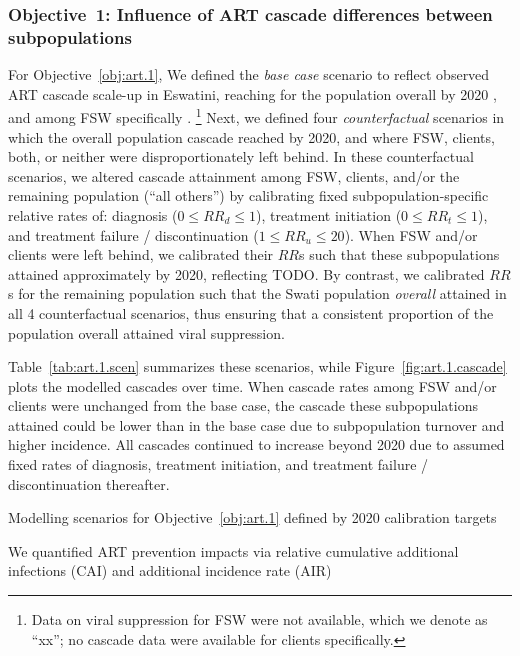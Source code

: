 \subsubsection{Objective~1: Influence of ART cascade differences between subpopulations}\label{art.meth.obj.1}
For Objective~\ref{obj:art.1},
We defined the \emph{base case} scenario to reflect
observed ART cascade scale-up in Eswatini, reaching
\cashi for the population overall by 2020 \cite{SHIMS3}, and
\casfsw among FSW specifically \cite{EswIBBS2022}.%
\footnote{Data on viral suppression for FSW were not available, which we denote as ``xx'';
  no cascade data were available for clients specifically.}
Next, we defined four \emph{counterfactual} scenarios in which
the overall population cascade reached \casmd by 2020,
and where FSW, clients, both, or neither were disproportionately left behind.
In these counterfactual scenarios, we altered cascade attainment among
FSW, clients, and/or the remaining population (``all others'') by calibrating
fixed subpopulation-specific relative rates of:
diagnosis ($0 \le {RR}_d \le 1$),
treatment initiation ($0 \le {RR}_t \le 1$), and
treatment failure / discontinuation ($1 \le {RR}_u \le 20$).
When FSW and/or clients were left behind, we calibrated their $RR$s such that
these subpopulations attained approximately \caslo by 2020,
reflecting TODO.
By contrast, we calibrated $RR$s for the remaining population such that
the Swati population \emph{overall} attained \casmd in all 4 counterfactual scenarios,
thus ensuring that a consistent proportion of the population overall
attained viral suppression.
\par
Table~\ref{tab:art.1.scen} summarizes these scenarios, while
Figure~\ref{fig:art.1.cascade} plots the modelled cascades over time.
When cascade rates among FSW and/or clients were unchanged from the base case,
the cascade these subpopulations attained could be lower than in the base case
due to subpopulation turnover and higher incidence.
All cascades continued to increase beyond 2020 due to assumed fixed rates of
diagnosis, treatment initiation, and treatment failure / discontinuation thereafter.
\begin{table}
  \centering
  \caption{Modelling scenarios for Objective~\ref{obj:art.1} defined by 2020 calibration targets}
  \label{tab:art.1.scen}
  
\end{table}
\par
We quantified ART prevention impacts via relative
cumulative additional infections (CAI) and additional incidence rate (AIR)
